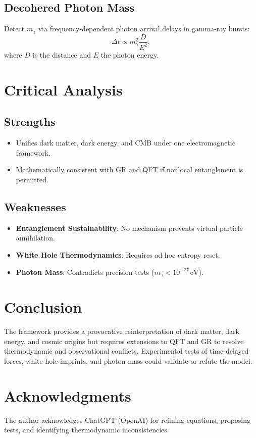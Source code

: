 \documentclass[12pt, a4paper]{article}
\begin{document}
\subsection{Decohered Photon Mass}
Detect \( m_{\gamma} \) via frequency-dependent photon arrival delays in gamma-ray bursts:
\[
\Delta t \propto m_{\gamma}^2 \frac{D}{E^2},
\]
where \( D \) is the distance and \( E \) the photon energy.

\section{Critical Analysis}
\subsection{Strengths}
\begin{itemize}
    \item Unifies dark matter, dark energy, and CMB under one electromagnetic framework.
    \item Mathematically consistent with GR and QFT if nonlocal entanglement is permitted.
\end{itemize}

\subsection{Weaknesses}
\begin{itemize}
    \item \textbf{Entanglement Sustainability}: No mechanism prevents virtual particle annihilation.
    \item \textbf{White Hole Thermodynamics}: Requires ad hoc entropy reset.
    \item \textbf{Photon Mass}: Contradicts precision tests (\( m_{\gamma} < 10^{-27} \, \text{eV} \)).
\end{itemize}

\section{Conclusion}
The framework provides a provocative reinterpretation of dark matter, dark energy, and cosmic origins but requires extensions to QFT and GR to resolve thermodynamic and observational conflicts. Experimental tests of time-delayed forces, white hole imprints, and photon mass could validate or refute the model.

\section*{Acknowledgments}
The author acknowledges ChatGPT (OpenAI) for refining equations, proposing tests, and identifying thermodynamic inconsistencies.
\end{document}
